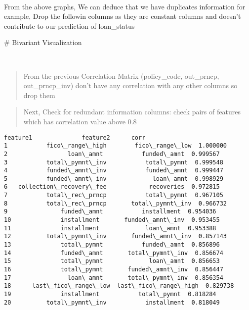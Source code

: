 \documentclass[11pt]{article}
\makeatletter
\newcommand{\boxspacing}{\kern\kvtcb@left@rule\kern\kvtcb@boxsep}
\newcommand{\prompt}[4]{
        {\ttfamily\llap{{\color{#2}[#3]:\hspace{3pt}#4}}\vspace{-\baselineskip}}
    }
\makeatother
\begin{document}
    \begin{center}
    \end{center}
    { \hspace*{\fill} \\}
    
    From the above graphs, We can deduce that we have duplicates information
for example, Drop the followin columns as they are constant columns and
doesn't contribute to our prediction of loan\_status

    \# Bivariant Visualization

    \begin{center}
    \end{center}
    { \hspace*{\fill} \\}
    
    \begin{quote}
From the previous Correlation Matrix (policy\_code, out\_prncp,
out\_prncp\_inv) don't have any correlation with any other columns so
drop them
\end{quote}

    \begin{quote}
Next, Check for redundant information columns: check pairs of features
which has correlation value above 0.8
\end{quote}

            \begin{tcolorbox}[breakable, size=fbox, boxrule=.5pt, pad at break*=1mm, opacityfill=0]
\prompt{Out}{outcolor}{42}{\boxspacing}
\begin{Verbatim}[commandchars=\\\{\}]
                   feature1              feature2      corr
1           fico\_range\_high        fico\_range\_low  1.000000
2                 loan\_amnt           funded\_amnt  0.999567
3           total\_pymnt\_inv           total\_pymnt  0.999548
4           funded\_amnt\_inv           funded\_amnt  0.999447
5           funded\_amnt\_inv             loan\_amnt  0.998929
6   collection\_recovery\_fee            recoveries  0.972815
7           total\_rec\_prncp           total\_pymnt  0.967105
8           total\_rec\_prncp       total\_pymnt\_inv  0.966732
9               funded\_amnt           installment  0.954036
10              installment       funded\_amnt\_inv  0.953455
11              installment             loan\_amnt  0.953388
12          total\_pymnt\_inv       funded\_amnt\_inv  0.857143
13              total\_pymnt           funded\_amnt  0.856896
14              funded\_amnt       total\_pymnt\_inv  0.856674
15              total\_pymnt             loan\_amnt  0.856653
16              total\_pymnt       funded\_amnt\_inv  0.856447
17                loan\_amnt       total\_pymnt\_inv  0.856354
18      last\_fico\_range\_low  last\_fico\_range\_high  0.829738
19              installment           total\_pymnt  0.818284
20          total\_pymnt\_inv           installment  0.818049
\end{Verbatim}
\end{tcolorbox}
        
\end{document}
